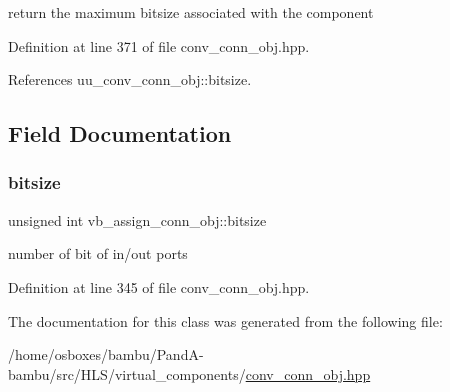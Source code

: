return the maximum bitsize associated with the component 



Definition at line 371 of file conv\+\_\+conn\+\_\+obj.\+hpp.



References uu\+\_\+conv\+\_\+conn\+\_\+obj\+::bitsize.



\subsection{Field Documentation}
\mbox{\label{classvb__assign__conn__obj_ac039d4bbfcee34d8277ab5afd2941f70}} 
\subsubsection{\texorpdfstring{bitsize}{bitsize}}
{\footnotesize\ttfamily unsigned int vb\+\_\+assign\+\_\+conn\+\_\+obj\+::bitsize\hspace{0.3cm}{\ttfamily [private]}}



number of bit of in/out ports 



Definition at line 345 of file conv\+\_\+conn\+\_\+obj.\+hpp.



The documentation for this class was generated from the following file\+:\begin{DoxyCompactItemize}
\item 
/home/osboxes/bambu/\+Pand\+A-\/bambu/src/\+H\+L\+S/virtual\+\_\+components/\hyperlink{conv__conn__obj_8hpp}{conv\+\_\+conn\+\_\+obj.\+hpp}\end{DoxyCompactItemize}
